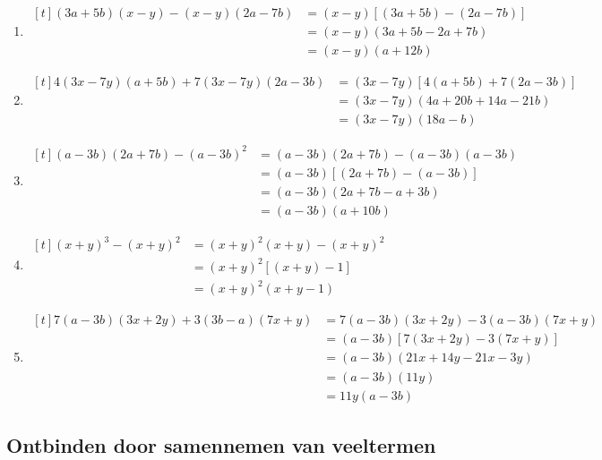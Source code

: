 \documentclass{bis}
\begin{document}
\begin{solution}
\begin{enumerate}
  \item $\begin{aligned}[t](3a + 5b) (x - y) - (x - y) (2a - 7b)
  &= (x - y) [(3a + 5b) - (2a - 7b)]\\
  &= (x - y) (3a + 5b - 2a + 7b)\\
	&= (x - y) (a + 12b)\end{aligned}$
  \item $\begin{aligned}[t]4 (3x - 7y) (a + 5b) + 7 (3x - 7y) (2a - 3b)
  &= (3x - 7y) [4 (a + 5b) + 7 (2a - 3b)]\\
	&= (3x - 7y) (4a + 20b + 14a - 21b)\\
	&= (3x - 7y) (18a - b)\end{aligned}$
  \item $\begin{aligned}[t](a - 3b) (2a + 7b) - (a - 3b)^2
  &= (a - 3b) (2a + 7b) - (a - 3b)(a - 3b)\\
	&= (a - 3b) [(2a + 7b) - (a - 3b)]\\
	&= (a - 3b) (2a + 7b - a + 3b)\\
	&= (a - 3b) (a + 10b)\end{aligned}$
  \item $\begin{aligned}[t](x + y)^3 - (x + y)^2
  &= (x + y)^2 (x + y) - (x + y)^2\\
	&= (x + y)^2 [(x + y) - 1]\\
	&= (x + y)^2 (x + y - 1)\end{aligned}$
  \item $\begin{aligned}[t]7 (a - 3b) (3x + 2y) + 3 (3b - a) (7x + y)
  &= 7 (a - 3b) (3x + 2y) - 3 (a - 3b) (7x + y)\\
	&= (a - 3b) [7 (3x + 2y) - 3 (7x + y)]\\
	&= (a - 3b) (21 x + 14y - 21 x - 3y)\\
	&= (a - 3b) (11y)\\
	&= 11y (a - 3b)\end{aligned}$
\end{enumerate}
\end{solution}

\subsection{Ontbinden door samennemen van veeltermen}
\end{document}

